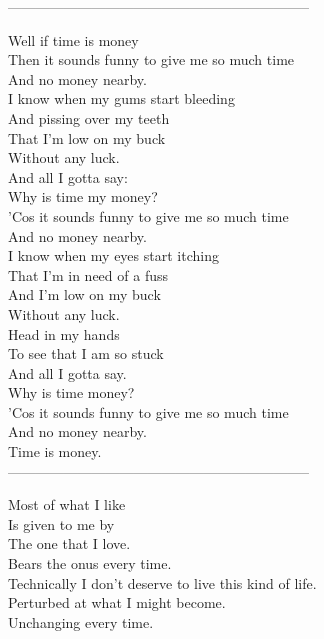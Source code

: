 -----------------------------------------------------------------



Well if time is money \\
Then it sounds funny to give me so much time \\
And no money nearby. \\

I know when my gums start bleeding \\
And pissing over my teeth \\
That I'm low on my buck \\
Without any luck. \\
And all I gotta say: \\

Why is time my money? \\
'Cos it sounds funny to give me so much time \\
And no money nearby. \\

I know when my eyes start itching \\
That I'm in need of a fuss \\
And I'm low on my buck \\
Without any luck. \\
Head in my hands \\
To see that I am so stuck \\
And all I gotta say. \\

Why is time money? \\
'Cos it sounds funny to give me so much time \\
And no money nearby. \\

Time is money. \\

-----------------------------------------------------------------



Most of what I like \\
Is given to me by \\
The one that I love. \\
Bears the onus every time. \\

Technically I don't deserve to live this kind of life. \\
Perturbed at what I might become. \\
Unchanging every time. \\

